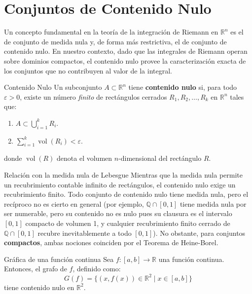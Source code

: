 \documentclass[11pt,a4paper]{article}
\begin{document}
\section{Conjuntos de Contenido Nulo}

Un concepto fundamental en la teoría de la integración de Riemann en $\mathbb{R}^n$ es el de conjunto de medida nula y, de forma más restrictiva, el de conjunto de contenido nulo. En nuestro contexto, dado que las integrales de Riemann operan sobre dominios compactos, el contenido nulo provee la caracterización exacta de los conjuntos que no contribuyen al valor de la integral.

\begin{definicionbox}{Contenido Nulo}
Un subconjunto $A \subset \mathbb{R}^n$ tiene \textbf{contenido nulo} si, para todo $\varepsilon > 0$, existe un número \emph{finito} de rectángulos cerrados $R_1, R_2, \dots, R_k$ en $\mathbb{R}^n$ tales que:
\begin{enumerate}
    \item $A \subset \bigcup_{i=1}^k R_i$.
    \item $\sum_{i=1}^k \operatorname{vol}(R_i) < \varepsilon$.
\end{enumerate}
donde $\operatorname{vol}(R)$ denota el volumen $n$-dimensional del rectángulo $R$.
\end{definicionbox}

\begin{observacionbox}{Relación con la medida nula de Lebesgue}
Mientras que la medida nula permite un recubrimiento contable infinito de rectángulos, el contenido nulo exige un recubrimiento finito. Todo conjunto de contenido nulo tiene medida nula, pero el recíproco no es cierto en general (por ejemplo, $\mathbb{Q} \cap [0,1]$ tiene medida nula por ser numerable, pero su contenido no es nulo pues su clausura es el intervalo $[0,1]$ compacto de volumen 1, y cualquier recubrimiento finito cerrado de $\mathbb{Q} \cap [0,1]$ recubre inevitablemente a todo $[0,1]$). No obstante, para conjuntos \textbf{compactos}, ambas nociones coinciden por el Teorema de Heine-Borel.
\end{observacionbox}

\begin{teoremabox}{Gráfica de una función continua}
Sea $f: [a,b] \to \mathbb{R}$ una función continua. Entonces, el grafo de $f$, definido como:
\[
G(f) = \{ (x, f(x)) \in \mathbb{R}^2 \mid x \in [a,b] \}
\]
tiene contenido nulo en $\mathbb{R}^2$.
\end{teoremabox}
\end{document}

